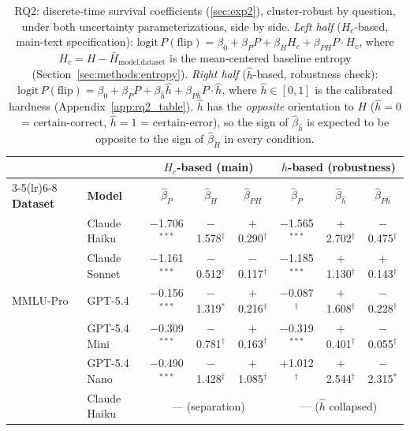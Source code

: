 \begin{table}[t]
\centering
\caption{RQ2: discrete-time survival coefficients (\autoref{sec:exp2}), cluster-robust by question, under both uncertainty parameterizations, side by side.
  \emph{Left half} ($H_c$-based, main-text specification):
  $\mathrm{logit}\,P(\mathrm{flip}) =
   \beta_0 + \beta_P P + \beta_H H_c + \beta_{PH} P\!\cdot\!H_c$,
  where $H_c = H - \bar{H}_{\text{model,dataset}}$ is the mean-centered
  baseline entropy (Section~\ref{sec:methods:entropy}).
  \emph{Right half} ($\hat h$-based, robustness check):
  $\mathrm{logit}\,P(\mathrm{flip}) =
   \beta_0 + \beta_P P + \beta_{\hat h} \hat h + \beta_{P\hat h} P\!\cdot\!\hat h$,
  where $\hat h \in [0, 1]$ is the calibrated hardness
  (Appendix~\ref{app:rq2_table}).
  $\hat h$ has the \emph{opposite} orientation to $H$
  ($\hat h {=} 0$ = certain-correct, $\hat h {=} 1$ = certain-error),
  so the sign of $\hat\beta_{\hat h}$ is expected to be
  opposite to the sign of $\hat\beta_H$ in every condition.}
\label{tab:rq2_combined}
\small
\setlength{\tabcolsep}{4pt}
\begin{tabular}{ll ccc ccc}
\toprule
 & & \multicolumn{3}{c}{\textbf{$H_c$-based (main)}} & \multicolumn{3}{c}{\textbf{$\hat h$-based (robustness)}} \\
\cmidrule(lr){3-5}\cmidrule(lr){6-8}
\textbf{Dataset} & \textbf{Model} & $\hat\beta_P$ & $\hat\beta_H$ & $\hat\beta_{PH}$ & $\hat\beta_P$ & $\hat\beta_{\hat h}$ & $\hat\beta_{P\hat h}$ \\
\midrule
\multirow{5}{*}{MMLU-Pro}
 & Claude Haiku & $-$1.706$^{***}$ & $-$1.578$^\dagger$ & $+$0.290$^\dagger$ & $-$1.565$^{***}$ & $+$2.702$^\dagger$ & $-$0.475$^\dagger$ \\
  & Claude Sonnet & $-$1.161$^{***}$ & $-$0.512$^\dagger$ & $-$0.117$^\dagger$ & $-$1.185$^{***}$ & $+$1.130$^\dagger$ & $+$0.143$^\dagger$ \\
  & GPT-5.4 & $-$0.156$^{***}$ & $-$1.319$^{*}$ & $+$0.216$^\dagger$ & $-$0.087$^\dagger$ & $+$1.608$^\dagger$ & $-$0.228$^\dagger$ \\
  & GPT-5.4 Mini & $-$0.309$^{***}$ & $-$0.781$^\dagger$ & $+$0.163$^\dagger$ & $-$0.319$^{***}$ & $+$0.401$^\dagger$ & $-$0.055$^\dagger$ \\
  & GPT-5.4 Nano & $-$0.490$^{***}$ & $-$1.428$^\dagger$ & $+$1.085$^\dagger$ & $+$1.012$^\dagger$ & $+$2.544$^\dagger$ & $-$2.315$^{*}$ \\
\addlinespace
\midrule
\multirow{5}{*}{GPQA-Diamond}
 & Claude Haiku & \multicolumn{3}{c}{--- \tiny{(separation)}} & \multicolumn{3}{c}{--- \tiny{($\hat h$ collapsed)}} \\

\end{tabular}
\end{table}
